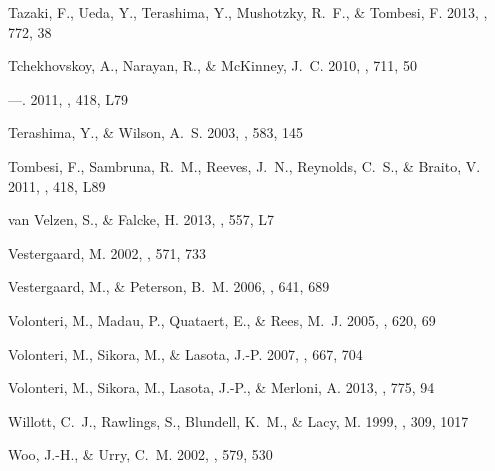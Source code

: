 \documentclass[preprint2,twocolappendix]{aastex6}
\begin{document}
\begin{thebibliography}{}
{Tazaki}, F., {Ueda}, Y., {Terashima}, Y., {Mushotzky}, R.~F., \& {Tombesi}, F.
  2013, \apj, 772, 38

{Tchekhovskoy}, A., {Narayan}, R., \& {McKinney}, J.~C. 2010, \apj, 711, 50

---. 2011, \mnras, 418, L79

{Terashima}, Y., \& {Wilson}, A.~S. 2003, \apj, 583, 145

{Tombesi}, F., {Sambruna}, R.~M., {Reeves}, J.~N., {Reynolds}, C.~S., \&
  {Braito}, V. 2011, \mnras, 418, L89

{van Velzen}, S., \& {Falcke}, H. 2013, \aap, 557, L7

{Vestergaard}, M. 2002, \apj, 571, 733

{Vestergaard}, M., \& {Peterson}, B.~M. 2006, \apj, 641, 689

{Volonteri}, M., {Madau}, P., {Quataert}, E., \& {Rees}, M.~J. 2005, \apj, 620,
  69

{Volonteri}, M., {Sikora}, M., \& {Lasota}, J.-P. 2007, \apj, 667, 704

{Volonteri}, M., {Sikora}, M., {Lasota}, J.-P., \& {Merloni}, A. 2013, \apj,
  775, 94

{Willott}, C.~J., {Rawlings}, S., {Blundell}, K.~M., \& {Lacy}, M. 1999,
  \mnras, 309, 1017

{Woo}, J.-H., \& {Urry}, C.~M. 2002, \apj, 579, 530


\end{thebibliography}
\end{document}
